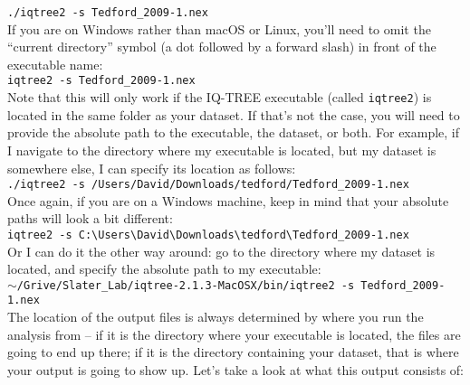 \documentclass[12pt]{article}
\begin{document}
\texttt{./iqtree2 -s Tedford\_2009-1.nex} \\

\noindent If you are on Windows rather than macOS or Linux, you'll need to omit the ``current directory'' symbol (a dot followed by a forward slash) in front of the executable name: \\

\texttt{iqtree2 -s Tedford\_2009-1.nex} \\

\noindent Note that this will only work if the IQ-TREE executable (called \texttt{iqtree2}) is located in the same folder as your dataset. If that's not the case, you will need to provide the absolute path to the executable, the dataset, or both. For example, if I navigate to the directory where my executable is located, but my dataset is somewhere else, I can specify its location as follows: \\

\texttt{./iqtree2 -s /Users/David/Downloads/tedford/Tedford\_2009-1.nex} \\

\noindent Once again, if you are on a Windows machine, keep in mind that your absolute paths will look a bit different: \\

\texttt{iqtree2 -s C:\textbackslash Users\textbackslash David\textbackslash Downloads\textbackslash tedford\textbackslash Tedford\_2009-1.nex} \\

\noindent Or I can do it the other way around: go to the directory where my dataset is located, and specify the absolute path to my executable: \\

\texttt{{\footnotesize $\sim$}/Grive/Slater\_Lab/iqtree-2.1.3-MacOSX/bin/iqtree2 -s Tedford\_2009-1.nex} \\

\noindent The location of the output files is always determined by where you run the analysis from -- if it is the directory where your executable is located, the files are going to end up there; if it is the directory containing your dataset, that is where your output is going to show up. Let's take a look at what this output consists of: \\
\end{document}
